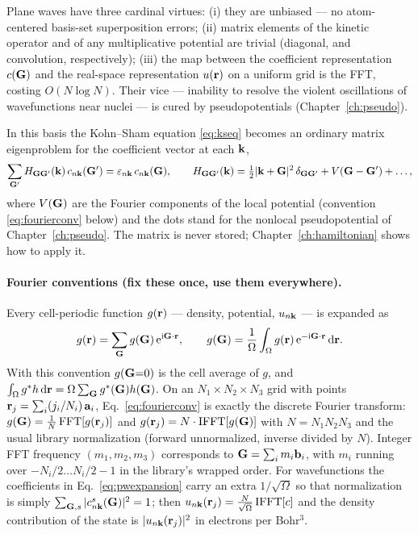 Plane waves have three cardinal virtues: (i) they are unbiased --- no
atom-centered basis-set superposition errors; (ii) matrix elements of the kinetic
operator and of any multiplicative potential are trivial (diagonal, and
convolution, respectively); (iii) the map between the coefficient
representation $c(\mathbf{G})$ and the real-space representation $u(\mathbf{r})$ on a
uniform grid is the FFT, costing $O(N \log N)$. Their vice --- inability to
resolve the violent oscillations of wavefunctions near nuclei --- is cured by
pseudopotentials (Chapter~\ref{ch:pseudo}).

In this basis the Kohn--Sham equation \eqref{eq:kseq} becomes an ordinary
matrix eigenproblem for the coefficient vector at each $\mathbf{k}$,
\begin{equation}
\sum_{\mathbf{G}'} H_{\mathbf{G}\mathbf{G}'}(\mathbf{k})\, c_{n\mathbf{k}}(\mathbf{G}') = \varepsilon_{n\mathbf{k}}\,
c_{n\mathbf{k}}(\mathbf{G}),
\qquad
H_{\mathbf{G}\mathbf{G}'}(\mathbf{k}) = \tfrac12|\mathbf{k}+\mathbf{G}|^2\,\delta_{\mathbf{G}\mathbf{G}'}
+ V(\mathbf{G} - \mathbf{G}') + \dots,
\label{eq:pwmatrix}
\end{equation}
where $V(\mathbf{G})$ are the Fourier components of the local potential
(convention \eqref{eq:fourierconv} below) and the dots stand for the
nonlocal pseudopotential of Chapter~\ref{ch:pseudo}. The matrix is never
stored; Chapter~\ref{ch:hamiltonian} shows how to apply it.

\paragraph{Fourier conventions (fix these once, use them everywhere).}
Every cell-periodic function $g(\mathbf{r})$ --- density, potential, $u_{n\mathbf{k}}$ ---
is expanded as
\begin{equation}
g(\mathbf{r}) = \sum_{\mathbf{G}} g(\mathbf{G})\, \mathrm{e}^{\mathrm{i}\mathbf{G}\cdot\mathbf{r}},
\qquad
g(\mathbf{G}) = \frac{1}{\Omega}\int_{\Omega} g(\mathbf{r})\, \mathrm{e}^{-\mathrm{i}\mathbf{G}\cdot\mathbf{r}}\,\mathrm{d}\mathbf{r} .
\label{eq:fourierconv}
\end{equation}
With this convention $g(\mathbf{G}{=}0)$ is the cell average of $g$, and
$\int_\Omega g^* h\,\mathrm{d}\mathbf{r} = \Omega\sum_{\mathbf{G}} g^*(\mathbf{G}) h(\mathbf{G})$. On an
$N_1{\times}N_2{\times}N_3$ grid with points
$\mathbf{r}_{j} = \sum_i (j_i/N_i)\,\mathbf a_i$, Eq.~\eqref{eq:fourierconv} is
exactly the discrete Fourier transform:
$g(\mathbf{G}) = \tfrac{1}{N}\,\mathrm{FFT}[g(\mathbf{r}_j)]$ and
$g(\mathbf{r}_j) = N\cdot\mathrm{IFFT}[g(\mathbf{G})]$ with $N = N_1N_2N_3$ and the usual
library normalization (forward unnormalized, inverse divided by $N$).
Integer FFT frequency $(m_1,m_2,m_3)$ corresponds to
$\mathbf{G} = \sum_i m_i \mathbf b_i$, with $m_i$ running over
$-N_i/2 \dots N_i/2 - 1$ in the library's wrapped order. For wavefunctions
the coefficients in Eq.~\eqref{eq:pwexpansion} carry an extra
$1/\sqrt\Omega$ so that normalization is simply
$\sum_{\mathbf{G},s} |c^s_{n\mathbf{k}}(\mathbf{G})|^2 = 1$; then
$u_{n\mathbf{k}}(\mathbf{r}_j) = \tfrac{N}{\sqrt\Omega}\,\mathrm{IFFT}[c]$ and the density
contribution of the state is $|u_{n\mathbf{k}}(\mathbf{r}_j)|^2$ in electrons per
Bohr$^3$.

